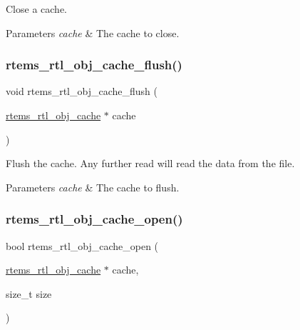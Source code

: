 Close a cache.


\begin{DoxyParams}{Parameters}
{\em cache} & The cache to close. \\
\hline
\end{DoxyParams}
\mbox{\label{rtl-obj-cache_8h_a111b8cc86622e49926e5267d2be870e7}} 
\subsubsection{\texorpdfstring{rtems\_rtl\_obj\_cache\_flush()}{rtems\_rtl\_obj\_cache\_flush()}}
{\footnotesize\ttfamily void rtems\+\_\+rtl\+\_\+obj\+\_\+cache\+\_\+flush (\begin{DoxyParamCaption}\item[{\mbox{\hyperlink{structrtems__rtl__obj__cache}{rtems\+\_\+rtl\+\_\+obj\+\_\+cache}} $\ast$}]{cache }\end{DoxyParamCaption})}

Flush the cache. Any further read will read the data from the file.


\begin{DoxyParams}{Parameters}
{\em cache} & The cache to flush. \\
\hline
\end{DoxyParams}
\mbox{\label{rtl-obj-cache_8h_a5b2951671bf88bf7b8e915dd8938b691}} 
\subsubsection{\texorpdfstring{rtems\_rtl\_obj\_cache\_open()}{rtems\_rtl\_obj\_cache\_open()}}
{\footnotesize\ttfamily bool rtems\+\_\+rtl\+\_\+obj\+\_\+cache\+\_\+open (\begin{DoxyParamCaption}\item[{\mbox{\hyperlink{structrtems__rtl__obj__cache}{rtems\+\_\+rtl\+\_\+obj\+\_\+cache}} $\ast$}]{cache,  }\item[{size\+\_\+t}]{size }\end{DoxyParamCaption})}

